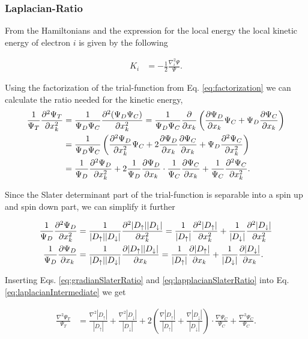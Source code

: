 		\subsubsection{Laplacian-Ratio}
			From the Hamiltonians and the expression for the local energy the local kinetic energy of electron \(i\) is given by the following

			\begin{align}
				K_i &= - \frac{1}{2} \frac{\nabla^2_i \Psi}{\Psi}.
			\end{align}

			Using the factorization of the trial-function from Eq. \eqref{eq:factorization} we can calculate the ratio needed for the kinetic energy,
			\begin{align}
				\frac{1}{\Psi_T}\pdv[2]{\Psi_T}{x_k} &= \frac{1}{\Psi_D\Psi_C} \pdv[2]{(\Psi_D\Psi_C)}{x_k} = \frac{1}{\Psi_D\Psi_C} \pdv{}{x_k} \left( \pdv{\Psi_D}{x_k} \Psi_C +\Psi_D \pdv{\Psi_C}{x_k} \right)
				\\
				&= \frac{ 1 }{\Psi_D\Psi_C} \left( \pdv[2]{\Psi_D}{x_k} \Psi_C   + 2 \pdv{ \Psi_D }{x_k}\pdv{ \Psi_C }{x_k} + \Psi_D\pdv[2]{\Psi_C}{x_k} \right)
				\\
				&= \frac{1}{\Psi_D}\pdv[2]{\Psi_D}{x_k}  + 2 \frac{1}{\Psi_D} \pdv{ \Psi_D }{x_k} \cdot \frac{1}{\Psi_C}\pdv{ \Psi_C }{x_k} +  \frac{1}{\Psi_C}\pdv[2]{\Psi_C}{x_k}. \label{eq:laplacianIntermediate}
			\end{align}

			Since the Slater determinant part of the trial-function is separable into a spin up and spin down part, we can simplify it further

			\begin{align}
				\frac{1}{\Psi_D}\pdv[2]{\Psi_D}{x_k} &= \frac{1}{|D_\uparrow| |D_\downarrow|} \pdv[2]{ |D_\uparrow| |D_\downarrow| }{x_k}
				= \frac{1}{|D_\uparrow|} \pdv[2]{|D_\uparrow|}{x_k} + \frac{1}{|D_\downarrow|} \pdv[2]{|D_\downarrow|}{x_k} \label{eq:lapplacianSlaterRatio}
				\\
				\frac{1}{\Psi_D} \pdv{ \Psi_D }{x_k}  &=  \frac{1}{|D_\uparrow| |D_\downarrow|} \pdv{ |D_\uparrow| |D_\downarrow| }{x_k}
				= \frac{1}{|D_\uparrow|} \pdv{|D_\uparrow|}{x_k} + \frac{1}{|D_\downarrow|} \pdv{|D_\downarrow|}{x_k}. \label{eq:gradianSlaterRatio}
			\end{align}

			Inserting Eqs. \eqref{eq:gradianSlaterRatio} and \eqref{eq:lapplacianSlaterRatio} into Eq. \eqref{eq:laplacianIntermediate} we get

			\begin{align}
				\frac{\nabla^2 \Psi_T}{\Psi_T} &= \frac{\nabla^2 |D_\uparrow|}{|D_\uparrow|} + \frac{\nabla^2 |D_\downarrow|}{|D_\downarrow|} + 2 \left( \frac{\nabla |D_\uparrow|}{|D_\uparrow|} + \frac{\nabla |D_\downarrow|}{|D_\downarrow|} \right) \cdot \frac{\nabla\Psi_C}{\Psi_C} +  \frac{\nabla^2\Psi_C}{\Psi_C}.  \label{eq:kineticRatio}
			\end{align}

